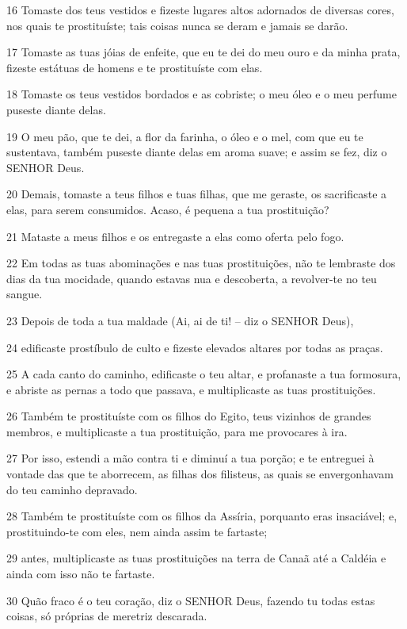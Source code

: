 \par 16 Tomaste dos teus vestidos e fizeste lugares altos adornados de diversas cores, nos quais te prostituíste; tais coisas nunca se deram e jamais se darão.
\par 17 Tomaste as tuas jóias de enfeite, que eu te dei do meu ouro e da minha prata, fizeste estátuas de homens e te prostituíste com elas.
\par 18 Tomaste os teus vestidos bordados e as cobriste; o meu óleo e o meu perfume puseste diante delas.
\par 19 O meu pão, que te dei, a flor da farinha, o óleo e o mel, com que eu te sustentava, também puseste diante delas em aroma suave; e assim se fez, diz o SENHOR Deus.
\par 20 Demais, tomaste a teus filhos e tuas filhas, que me geraste, os sacrificaste a elas, para serem consumidos. Acaso, é pequena a tua prostituição?
\par 21 Mataste a meus filhos e os entregaste a elas como oferta pelo fogo.
\par 22 Em todas as tuas abominações e nas tuas prostituições, não te lembraste dos dias da tua mocidade, quando estavas nua e descoberta, a revolver-te no teu sangue.
\par 23 Depois de toda a tua maldade (Ai, ai de ti! -- diz o SENHOR Deus),
\par 24 edificaste prostíbulo de culto e fizeste elevados altares por todas as praças.
\par 25 A cada canto do caminho, edificaste o teu altar, e profanaste a tua formosura, e abriste as pernas a todo que passava, e multiplicaste as tuas prostituições.
\par 26 Também te prostituíste com os filhos do Egito, teus vizinhos de grandes membros, e multiplicaste a tua prostituição, para me provocares à ira.
\par 27 Por isso, estendi a mão contra ti e diminuí a tua porção; e te entreguei à vontade das que te aborrecem, as filhas dos filisteus, as quais se envergonhavam do teu caminho depravado.
\par 28 Também te prostituíste com os filhos da Assíria, porquanto eras insaciável; e, prostituindo-te com eles, nem ainda assim te fartaste;
\par 29 antes, multiplicaste as tuas prostituições na terra de Canaã até a Caldéia e ainda com isso não te fartaste.
\par 30 Quão fraco é o teu coração, diz o SENHOR Deus, fazendo tu todas estas coisas, só próprias de meretriz descarada.

